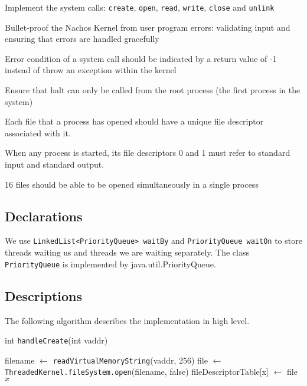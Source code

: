 \documentclass{article}
\begin{document}
\begin{spacing}{1.1}
\begin{asparaitem}
\item Implement the system calls: \texttt{create}, \texttt{open}, \texttt{read}, \texttt{write}, \texttt{close} and \texttt{unlink}\\
\item Bullet-proof the Nachos Kernel from user program errors: validating input and ensuring that errors are handled gracefully\\
\item Error condition of a system call should be indicated by a return value of -1 instead of throw an exception within the kernel\\
\item Ensure that halt can only be called from the root process (the first process in the system)\\
\item Each file that a process has opened should have a unique file descriptor associated with it.\\
\item When any process is started, its file descriptors 0 and 1 must refer to standard input and standard output.\\
\item 16 files should be able to be opened simultaneously in a single process
\end{asparaitem}

\subsection{Declarations}

We use \texttt{LinkedList<PriorityQueue> waitBy} and \texttt{PriorityQueue waitOn} to store threads waiting us and threads we are waiting separately. The class \texttt{PriorityQueue} is implemented by java.util.PriorityQueue.

\subsection{Descriptions}

The following algorithm describes the implementation in high level.

\begin{algorithm}
  \caption{int \texttt{handleCreate}(int vaddr)}
\begin{algorithmic}[1]
  \ENDIF
  \STATE filename $\leftarrow$ \texttt{readVirtualMemoryString}(vaddr, 256)
  \ENDIF
    \STATE file $\leftarrow$ \texttt{ThreadedKernel.fileSystem.open}(filename, false)
    \STATE fileDescriptorTable[x] $\leftarrow$ file
    \RETURN $x$
  \ELSE
  \ENDIF 
\end{algorithmic}
\end{algorithm}


\end{spacing}
\end{document}
